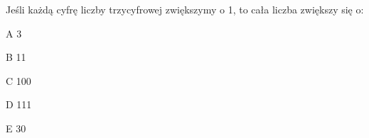 \begin{tresc}
Jeśli każdą cyfrę liczby trzycyfrowej zwiększymy o 1, to cała liczba zwiększy się o:
\end{tresc}
\begin{wariant}{A} 3 \end{wariant}
\begin{wariant}{B} 11 \end{wariant}
\begin{wariant}{C} 100 \end{wariant}
\begin{wariant}{D} 111 \end{wariant}
\begin{wariant}{E} 30 \end{wariant}
